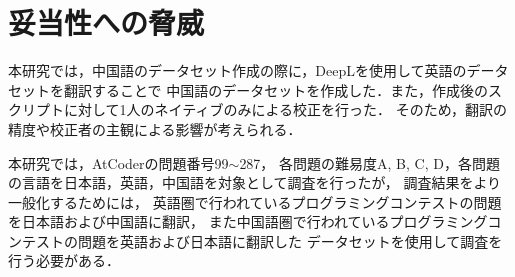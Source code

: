 \section{妥当性への脅威\label{threats}}

  本研究では，中国語のデータセット作成の際に，DeepLを使用して英語のデータセットを翻訳することで
  中国語のデータセットを作成した．また，作成後のスクリプトに対して1人のネイティブのみによる校正を行った．
  そのため，翻訳の精度や校正者の主観による影響が考えられる．

  本研究では，AtCoder\cite{AtCoder}の問題番号99${\sim}$287，
  各問題の難易度A, B, C, D，各問題の言語を日本語，英語，中国語を対象として調査を行ったが，
  調査結果をより一般化するためには，
  英語圏で行われているプログラミングコンテストの問題を日本語および中国語に翻訳，
  また中国語圏で行われているプログラミングコンテストの問題を英語および日本語に翻訳した
  データセットを使用して調査を行う必要がある．

